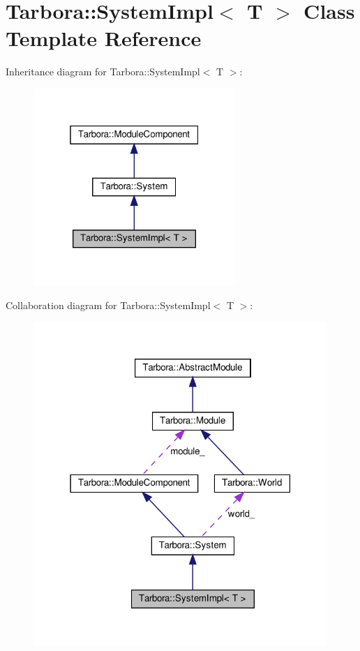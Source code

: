 \hypertarget{classTarbora_1_1SystemImpl}{}\section{Tarbora\+:\+:System\+Impl$<$ T $>$ Class Template Reference}
\label{classTarbora_1_1SystemImpl}


Inheritance diagram for Tarbora\+:\+:System\+Impl$<$ T $>$\+:\nopagebreak
\begin{figure}[H]
\begin{center}
\leavevmode
\includegraphics[width=217pt]{classTarbora_1_1SystemImpl__inherit__graph}
\end{center}
\end{figure}


Collaboration diagram for Tarbora\+:\+:System\+Impl$<$ T $>$\+:\nopagebreak
\begin{figure}[H]
\begin{center}
\leavevmode
\includegraphics[width=316pt]{classTarbora_1_1SystemImpl__coll__graph}
\end{center}
\end{figure}
